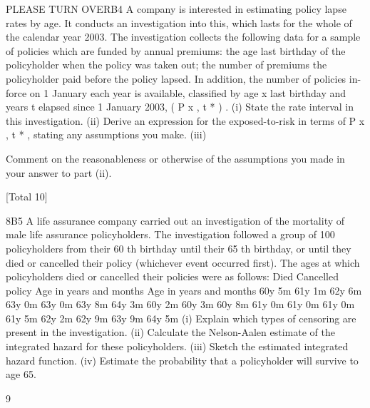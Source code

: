 \documentclass[a4paper,12pt]{article}
\begin{document}
\begin{enumerate}





PLEASE TURN OVERB4
A company is interested in estimating policy lapse rates by age. It conducts an
investigation into this, which lasts for the whole of the calendar year 2003. The
investigation collects the following data for a sample of policies which are funded by
annual premiums:
the age last birthday of the policyholder when the policy was taken out;
the number of premiums the policyholder paid before the policy lapsed.
In addition, the number of policies in-force on 1 January each year is available,
classified by age x last birthday and years t elapsed since 1 January 2003, ( P x , t * ) .
(i) State the rate interval in this investigation.
(ii) Derive an expression for the exposed-to-risk in terms of P x , t * , stating any
assumptions you make.
(iii)


Comment on the reasonableness or otherwise of the assumptions you made in
your answer to part (ii).

[Total 10]

 8B5
A life assurance company carried out an investigation of the mortality of male life
assurance policyholders. The investigation followed a group of 100 policyholders
from their 60 th birthday until their 65 th birthday, or until they died or cancelled their
policy (whichever event occurred first).
The ages at which policyholders died or cancelled their policies were as follows:
Died Cancelled policy
Age in
years and months Age in
years and months
60y 5m
61y 1m
62y 6m
63y 0m
63y 0m
63y 8m
64y 3m 60y 2m
60y 3m
60y 8m
61y 0m
61y 0m
61y 0m
61y 5m
62y 2m
62y 9m
63y 9m
64y 5m
(i) Explain which types of censoring are present in the investigation. 
(ii) Calculate the Nelson-Aalen estimate of the integrated hazard for these
policyholders. 
(iii) Sketch the estimated integrated hazard function. 
(iv) Estimate the probability that a policyholder will survive to age 65.

 9



\n





\end{enumerate}
\end{document}
